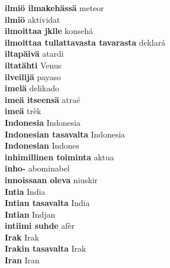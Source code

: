 \textbf{ ilmiö ilmakehässä  } meteor \\
\textbf{ ilmiö  } aktividat \\
\textbf{ ilmoittaa jklle  } konsehá \\
\textbf{ ilmoittaa tullattavasta tavarasta  } deklará \\
\textbf{ iltapäivä  } atardi \\
\textbf{ iltatähti  } Venus \\
\textbf{ ilveilijä  } payaso \\
\textbf{ imelä  } delikado \\
\textbf{ imeä itseensä  } atraé \\
\textbf{ imeä  } trèk \\
\textbf{ Indonesia  } Indonesia \\
\textbf{ Indonesian tasavalta  } Indonesia \\
\textbf{ Indonesian  } Indones \\
\textbf{ inhimillinen toiminta  } aktua \\
\textbf{ inho-  } abominabel \\
\textbf{ innoissaan oleva  } niuskir \\
\textbf{ Intia  } India \\
\textbf{ Intian tasavalta  } India \\
\textbf{ Intian  } Indjan \\
\textbf{ intiimi suhde  } afèr \\
\textbf{ Irak  } Irak \\
\textbf{ Irakin tasavalta  } Irak \\
\textbf{ Iran  } Iran \\
